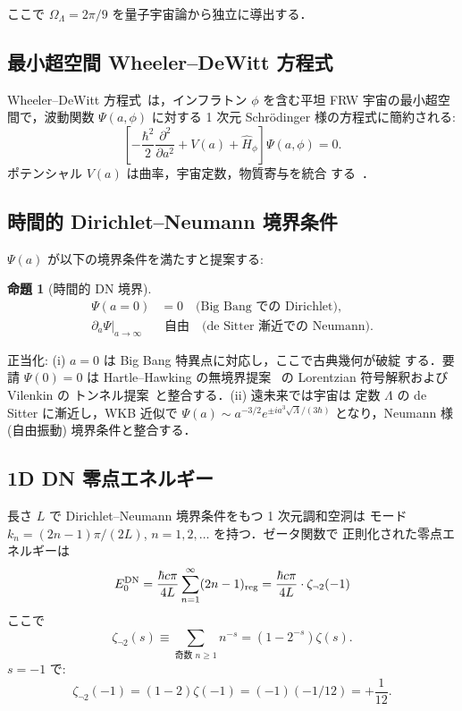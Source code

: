 \documentclass[11pt,a4paper]{article}
\newtheorem{proposition}{命題}
\begin{document}
ここで $\Omega_\Lambda = 2\pi/9$ を量子宇宙論から独立に導出する．

\subsection{最小超空間 Wheeler--DeWitt 方程式}

Wheeler--DeWitt 方程式~\cite{DeWitt1967,Wheeler1968}は，インフラトン
$\phi$ を含む平坦 FRW 宇宙の最小超空間で，波動関数 $\Psi(a,\phi)$
に対する 1 次元 Schr\"odinger 様の方程式に簡約される:
\begin{equation}
\left[-\frac{\hbar^2}{2}\frac{\partial^2}{\partial a^2} + V(a) + \hat H_\phi\right]\Psi(a,\phi) = 0.
\end{equation}
ポテンシャル $V(a)$ は曲率，宇宙定数，物質寄与を統合
する~\cite{Halliwell1990}．

\subsection{時間的 Dirichlet--Neumann 境界条件}

$\Psi(a)$ が以下の境界条件を満たすと提案する:

\begin{proposition}[時間的 DN 境界]
\begin{align}
\Psi(a=0) &= 0 \quad\text{(Big Bang での Dirichlet)},\\
\partial_a\Psi|_{a\to\infty} &\text{ 自由} \quad\text{(de Sitter 漸近での Neumann)}.
\end{align}
\end{proposition}

正当化: (i) $a = 0$ は Big Bang 特異点に対応し，ここで古典幾何が破綻
する．要請 $\Psi(0) = 0$ は Hartle--Hawking の無境界提案
~\cite{HartleHawking1983}の Lorentzian 符号解釈および Vilenkin の
トンネル提案~\cite{Vilenkin1982}と整合する．(ii) 遠未来では宇宙は
定数 $\Lambda$ の de Sitter に漸近し，WKB 近似で $\Psi(a) \sim
a^{-3/2}e^{\pm i a^3\sqrt\Lambda/(3\hbar)}$ となり，Neumann 様 (自由振動)
境界条件と整合する．

\subsection{1D DN 零点エネルギー}

長さ $L$ で Dirichlet--Neumann 境界条件をもつ 1 次元調和空洞は
モード $k_n = (2n-1)\pi/(2L)$, $n = 1, 2, \ldots$ を持つ．ゼータ関数で
正則化された零点エネルギーは
\begin{equation}
E_0^{\rm DN} = \frac{\hbar c\pi}{4L}\sum_{n=1}^\infty(2n-1)_{\text{reg}}
= \frac{\hbar c\pi}{4L}\cdot\zeta_{\neg 2}(-1)
\end{equation}
ここで
\begin{equation}
\zeta_{\neg 2}(s) \equiv \sum_{\text{奇数 }n \geq 1}n^{-s} = (1 - 2^{-s})\zeta(s).
\end{equation}
$s = -1$ で:
\begin{equation}
\zeta_{\neg 2}(-1) = (1-2)\zeta(-1) = (-1)(-1/12) = +\frac{1}{12}.
\end{equation}
\end{document}
